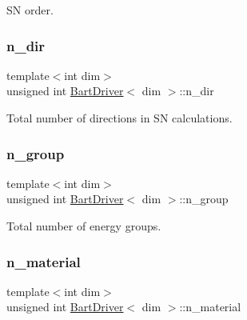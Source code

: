 SN order. 

\mbox{\label{class_bart_driver_aa1694538581e7941bbda0960bd3c7e39}} 
\subsubsection{\texorpdfstring{n\+\_\+dir}{n\_dir}}
{\footnotesize\ttfamily template$<$int dim$>$ \\
unsigned int \hyperlink{class_bart_driver}{Bart\+Driver}$<$ dim $>$\+::n\+\_\+dir\hspace{0.3cm}{\ttfamily [private]}}



Total number of directions in SN calculations. 

\mbox{\label{class_bart_driver_aeb5a04392c80b32379b02e18acbc1126}} 
\subsubsection{\texorpdfstring{n\+\_\+group}{n\_group}}
{\footnotesize\ttfamily template$<$int dim$>$ \\
unsigned int \hyperlink{class_bart_driver}{Bart\+Driver}$<$ dim $>$\+::n\+\_\+group\hspace{0.3cm}{\ttfamily [private]}}



Total number of energy groups. 

\mbox{\label{class_bart_driver_ae6c9141662b95c89b674ccdc04e9233f}} 
\subsubsection{\texorpdfstring{n\+\_\+material}{n\_material}}
{\footnotesize\ttfamily template$<$int dim$>$ \\
unsigned int \hyperlink{class_bart_driver}{Bart\+Driver}$<$ dim $>$\+::n\+\_\+material\hspace{0.3cm}{\ttfamily [private]}}



